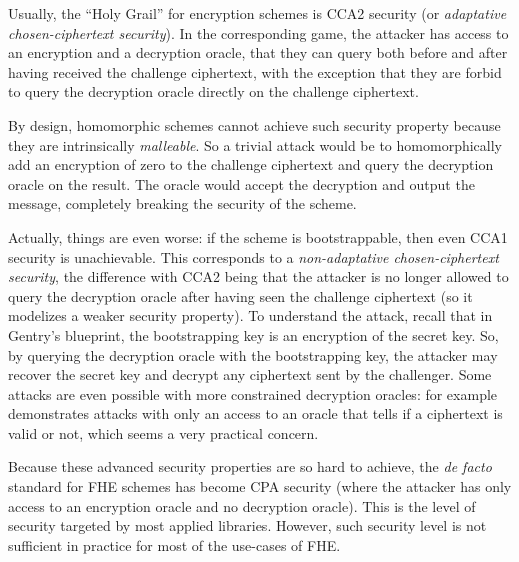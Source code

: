 Usually, the ``Holy Grail'' for encryption schemes is \textsf{CCA2} security (or \textit{adaptative chosen-ciphertext security}). In the corresponding game, the attacker has access to an encryption and a decryption oracle, that they can query both before and after having received the challenge ciphertext, with the exception that they are forbid to query the decryption oracle directly on the challenge ciphertext.



By design, homomorphic schemes cannot achieve such security property because they are intrinsically \textit{malleable}. So a trivial attack would be to homomorphically add an encryption of zero to the challenge ciphertext and query the decryption oracle on the result. The oracle would accept the decryption and output the message, completely breaking the security of the scheme.

Actually, things are even worse: if the scheme is bootstrappable, then even \textsf{CCA1} security is unachievable. This corresponds to a \textit{non-adaptative chosen-ciphertext security}, the difference with \textsf{CCA2} being that the attacker is no longer allowed to query the decryption oracle after having seen the challenge ciphertext (so it modelizes a weaker security property). To understand the attack, recall that in Gentry's blueprint, the bootstrapping key is an encryption of the secret key. So, by querying the decryption oracle with the bootstrapping key, the attacker may recover the secret key and decrypt any ciphertext sent by the challenger. Some attacks are even possible with more constrained decryption oracles: for example \cite{SAC:LMSV11} demonstrates attacks with only an access to an oracle that tells if a ciphertext is valid or not, which seems a very practical concern.


Because these advanced security properties are so hard to achieve, the \textit{de facto} standard for FHE schemes has become \textsf{CPA} security (where the attacker has only access to an encryption oracle and no decryption oracle). This is the level of security targeted by most applied libraries. However, such security level is not sufficient in practice for most of the use-cases of FHE.


